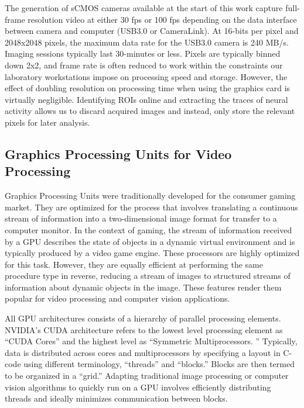 \documentclass[../main.tex]{subfiles}
\begin{document}
The generation of sCMOS cameras available at the start of this work capture full-frame resolution video at either 30 fps or 100 fps depending on the data interface between camera and computer (USB3.0 or CameraLink).
At 16-bits per pixel and 2048x2048 pixels, the maximum data rate for the USB3.0 camera is 240 MB/s.
Imaging sessions typically last 30-minutes or less.
Pixels are typically binned down 2x2, and frame rate is often reduced to work within the constraints our laboratory workstations impose on processing speed and storage.
However, the effect of doubling resolution on processing time when using the graphics card is virtually negligible.
Identifying ROIs online and extracting the traces of neural activity allows us to discard acquired images and instead, only store the relevant pixels for later analysis.

\subsection{
	Graphics Processing Units for Video Processing}\label{graphics-processing-units-for-video-processing}

Graphics Processing Units were traditionally developed for the consumer gaming market.
They are optimized for the process that involves translating a continuous stream of information into a two-dimensional image format for transfer to a computer monitor.
In the context of gaming, the stream of information received by a GPU describes the state of objects in a dynamic virtual environment and is typically produced by a video game engine.
These processors are highly optimized for this task.
However, they are equally efficient at performing the same procedure type in reverse, reducing a stream of images to structured streams of information about dynamic objects in the image.
These features render them popular for video processing and computer vision applications.

All GPU architectures consists of a hierarchy of parallel processing elements.
NVIDIA's CUDA architecture refers to the lowest level processing element as ``CUDA Cores'' and the highest level as ``Symmetric Multiprocessors.
'' Typically, data is distributed across
cores and multiprocessors by specifying a layout in C-code using
different terminology, ``threads'' and ``blocks.'' Blocks are then
termed to be organized in a ``grid.'' Adapting traditional image
processing or computer vision algorithms to quickly run on a GPU
involves efficiently distributing threads and ideally minimizes
communication between blocks.
\end{document}
